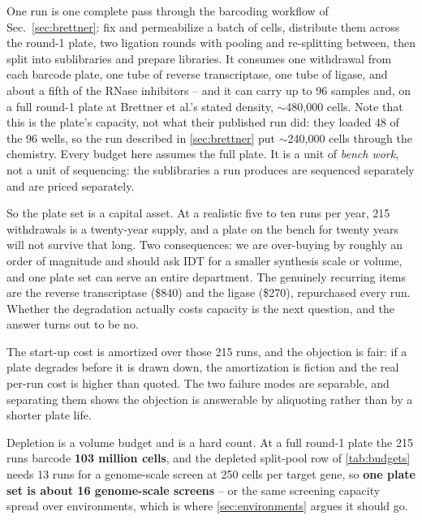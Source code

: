  One run is one complete pass through the
barcoding workflow of Sec.~\ref{sec:brettner}: fix and permeabilize a batch of
cells, distribute them across the round-1 plate, two ligation rounds with pooling
and re-splitting between, then split into sublibraries and prepare libraries. It
consumes one withdrawal from each barcode plate, one tube of reverse
transcriptase, one tube of ligase, and about a fifth of the RNase inhibitors -- and it can carry up to 96 samples and, on a full round-1 plate at Brettner et
al.'s stated density, $\sim$480{,}000 cells. Note that this is the plate's
capacity, not what their published run did: they loaded 48 of the 96 wells, so
the run described in \cref{sec:brettner} put $\sim$240{,}000 cells through the
chemistry. Every budget here assumes the full plate. It is a unit of \emph{bench work}, not a unit of
sequencing: the sublibraries a run produces are sequenced separately and are
priced separately.

So the plate set is a capital asset. At a realistic five to ten runs per year, 215
withdrawals is a twenty-year supply, and a plate on the bench for twenty years
will not survive that long. Two consequences: we are over-buying by roughly an
order of magnitude and should ask IDT for a smaller synthesis scale or volume,
and one plate set can serve an entire department. The genuinely recurring items
are the reverse transcriptase (\$840) and the ligase (\$270), repurchased every
run. Whether the degradation actually costs capacity is the next question, and
the answer turns out to be no.

 The start-up cost is amortized over those 215 runs, and the
objection is fair: if a plate degrades before it is drawn down, the amortization
is fiction and the real per-run cost is higher than quoted. The two failure modes
are separable, and separating them shows the objection is answerable by
aliquoting rather than by a shorter plate life.

Depletion is a volume budget and is a hard count. At a full round-1 plate the 215
runs barcode \textbf{103 million cells}, and the depleted split-pool row of
\cref{tab:budgets} needs 13 runs for a genome-scale screen at 250 cells per
target gene, so \textbf{one plate set is about 16 genome-scale screens} -- or the
same screening capacity spread over environments, which is where
\cref{sec:environments} argues it should go.

